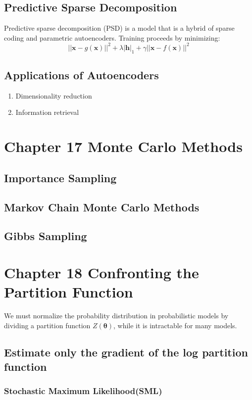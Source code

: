 \documentclass[12pt]{article}
\numberwithin{equation}{section}
\begin{document}
\subsection{Predictive Sparse Decomposition}
Predictive sparse decomposition (PSD) is a model that is a hybrid of sparse coding and parametric autoencoders. Training proceeds by minimizing:
	\begin{equation}
		||\bm{x}-g(\bm{x})||^2 + \lambda |\bm{h}|_1 + \gamma ||\bm{x}-f(\bm{x})||^2
	\end{equation}
\subsection{Applications of Autoencoders}
\begin{enumerate}
	\item Dimensionality reduction
	\item Information retrieval
\end{enumerate}
\section{Chapter 17 Monte Carlo Methods}
\subsection{Importance Sampling}
\subsection{Markov Chain Monte Carlo Methods}
\subsection{Gibbs Sampling}
\section{Chapter 18 Confronting the Partition Function}
We must normalize the probability distribution in probabilistic models by dividing a partition function $Z(\bm{\theta})$, while it is intractable for many models.
\subsection{Estimate only the gradient of the log partition function}
\subsubsection{Stochastic Maximum Likelihood(SML)}
\end{document}
